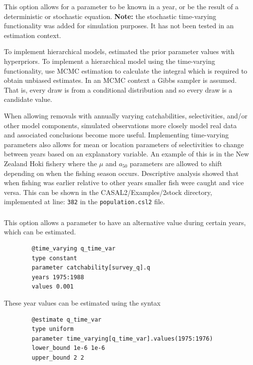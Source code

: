 This option allows for a parameter to be known in a year, or be the result of a deterministic or stochastic equation. \textbf{Note:} the stochastic time-varying functionality was added for simulation purposes. It has not been tested in an estimation context.

To implement hierarchical models, estimated the prior parameter values with hyperpriors. To implement a hierarchical model using the time-varying functionality, use MCMC estimation to calculate the integral which is required to obtain unbiased estimates. In an MCMC context a Gibbs sampler is assumed. That is, every draw is from a conditional distribution and so every draw is a candidate value.

When allowing removals with annually varying catchabilities, selectivities, and/or other model components, simulated observations more closely model real data and associated conclusions become more useful. Implementing time-varying parameters also allows for mean or location parameters of selectivities to change between years based on an explanatory variable. An example of this is in the New Zealand Hoki fishery where the $\mu$ and $a_{50}$ parameters are allowed to shift depending on when the fishing season occurs. Descriptive analysis showed that when fishing was earlier relative to other years smaller fish were caught and vice versa. This can be shown in the CASAL2/Examples/2stock directory, implemented at line: \texttt{382} in the \texttt{population.csl2} file.

\subsubsection[Constant]{}

This option allows a parameter to have an alternative value during certain years, which can be estimated.

{\small{\begin{verbatim}
		@time_varying q_time_var
		type constant
		parameter catchability[survey_q].q
		years 1975:1988
		values 0.001
		\end{verbatim}}}

These year values can be estimated using the syntax

{\small{\begin{verbatim}
		@estimate q_time_var
		type uniform
		parameter time_varying[q_time_var].values(1975:1976)
		lower_bound 1e-6 1e-6
		upper_bound 2 2
		\end{verbatim}}}

